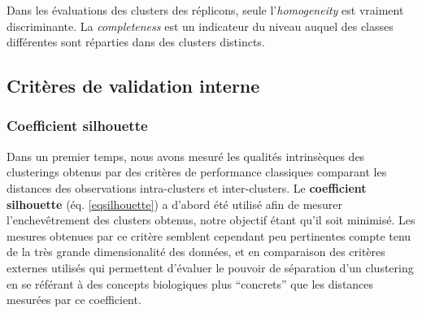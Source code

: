 Dans les évaluations des clusters des réplicons, seule l'\textit{homogeneity} est vraiment discriminante. La \textit{completeness} est un indicateur du niveau auquel des classes différentes sont réparties dans des clusters distincts.
    
\subsection{Critères de validation interne}
\subsubsection{Coefficient silhouette}
	Dans un premier temps, nous avons mesuré les qualités intrinsèques des clusterings obtenus par des critères de performance classiques comparant les distances des observations intra-clusters et inter-clusters. Le \textbf{coefficient silhouette} (éq. \ref{eqsilhouette}) a d'abord été utilisé afin de mesurer l'enchevêtrement des clusters obtenus, notre objectif étant qu'il soit minimisé. Les mesures obtenues par ce critère semblent cependant peu pertinentes compte tenu de la très grande dimensionalité des données, et en comparaison des critères externes utilisés qui permettent d'évaluer le pouvoir de séparation d'un clustering en se référant à des concepts biologiques plus “concrets” que les distances mesurées par ce coefficient.\\
	 
	
